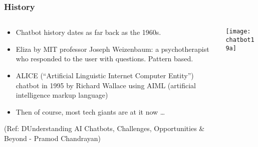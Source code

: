 




\begin{frame}[fragile]\frametitle{History}

    \begin{columns}
    \begin{column}[t]{0.5\linewidth}
	\begin{itemize}
	\item Chatbot history dates as far back as the 1960s.
	\item Eliza by MIT professor Joseph Weizenbaum: a psychotherapist who responded to the user with questions. Pattern based.
	\item ALICE (``Artificial Linguistic Internet Computer Entity'') chatbot in 1995 by Richard Wallace using AIML (artificial intelligence markup language)
	\item Then of course, most tech giants are at it now \ldots
	\end{itemize}
	
\tiny{(Ref: DUnderstanding AI Chatbots, Challenges, Opportunities \& Beyond - Pramod Chandrayan)}

	
    \end{column}
    \begin{column}[t]{0.5\linewidth}
\begin{center}
\texttt{[image: chatbot19a]}

\end{center}
    \end{column}
  \end{columns}
  
  

	
\end{frame}

